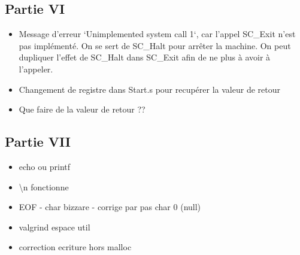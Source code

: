 \documentclass{article}
\begin{document}
\subsection{Partie VI}
\begin{itemize}
    \item Message d'erreur `Unimplemented system call 1`, car l'appel SC\_Exit n'est pas implémenté. On se sert de SC\_Halt pour arrêter la machine.
    On peut dupliquer l'effet de SC\_Halt dans SC\_Exit afin de ne plus à avoir à l'appeler.
    \item Changement de registre dans Start.s pour recupérer la valeur de retour
    \item Que faire de la valeur de retour ??
\end{itemize}

\subsection{Partie VII}
\begin{itemize}
    \item echo ou printf
    \item \textbackslash n fonctionne
    \item EOF - char bizzare - corrige par pas char 0 (null)
    \item valgrind espace util 
    \item correction ecriture hors malloc
\end{itemize}
\end{document}
